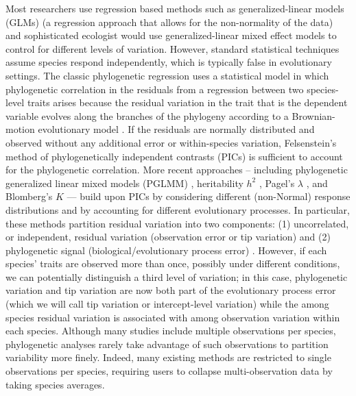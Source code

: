 \documentclass[12pt]{article}
\begin{document}
Most researchers use regression based methods such as generalized-linear models (GLMs) (a regression approach that allows for the non-normality of the data) and sophisticated ecologist would use generalized-linear mixed effect models \citep{bolker2009generalized} to control for different levels of variation.
However, standard statistical techniques assume species respond independently, which is typically false in evolutionary settings.
The classic phylogenetic regression uses a statistical model in which phylogenetic correlation in the residuals from a regression between two species-level traits arises because the residual variation in the trait that is the dependent variable evolves along the branches of the phylogeny according to a Brownian-motion evolutionary model \citep{felsenstein1985phylogenies}. 
If the residuals are normally distributed and observed without any additional error or within-species variation, Felsenstein's method of phylogenetically independent contrasts (PICs) \citep{felsenstein1985phylogenies, nicolakakis2000forebrain} is sufficient to account for the phylogenetic correlation.
More recent approaches -- including phylogenetic generalized linear mixed models (PGLMM) \citep{ives2011generalized}, heritability $h^2$ \citep{housworth2004phylogenetic}, Pagel's $\lambda$ \citep{pagel1999inferring}, and Blomberg's $K$ \citep{blomberg2003testing} --- build upon PICs by considering different (non-Normal) response distributions and by accounting for different evolutionary processes. 
In particular, these methods partition residual variation into two components: (1) uncorrelated, or independent, residual variation (observation error or tip variation) and (2) phylogenetic signal  (biological/evolutionary process error) \citep{hansen2012interpreting, housworth2004phylogenetic}.
However, if each species' traits are observed more than once, possibly under different conditions, we can potentially distinguish a third level of variation; in this case, phylogenetic variation and tip variation are now both part of the evolutionary process error (which we will call tip variation or intercept-level variation) while the among species residual variation is associated with among observation variation within each species.
Although many studies include multiple observations per species, phylogenetic analyses rarely take advantage of such observations to partition variability more finely.
Indeed, many existing methods are restricted to single observations per species, requiring users to collapse multi-observation data by taking species averages.
\end{document}

